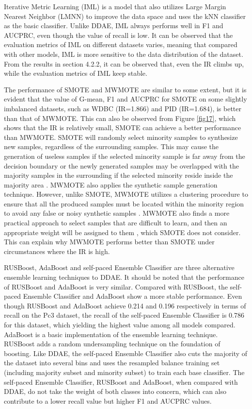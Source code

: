 Iterative Metric Learning (IML) is a model that also utilizes Large Margin Nearest Neighbor (LMNN) to improve the data space and uses the kNN classifier as the basic classifier. Unlike DDAE, IML always performs well in F1 and AUCPRC, even though the value of recall is low. It can be observed that the evaluation metrics of IML on different datasets varies, meaning that compared with other models, IML is more sensitive to the data distribution of the dataset. From the results in section 4.2.2, it can be observed that, even the IR climbs up, while the evaluation metrics of IML keep stable.

The performance of SMOTE and MWMOTE are similar to some extent, but it is evident that the value of G-mean, F1 and AUCPRC for SMOTE on some slightly imbalanced datasets, such as WDBC (IR=1.866) and PID (IR=1.684), is better than that of MWMOTE. This can also be observed from Figure \ref{fig17}, which shows that the IR is relatively small, SMOTE can achieve a better performance than MWMOTE. SMOTE will randomly select minority samples to synthesize new samples, regardless of the surrounding samples. This may cause the generation of useless samples if the selected minority sample is far away from the decision boundary or the newly generated samples may be overlapped with the majority samples in the surrounding if the selected minority reside inside the majority area \cite{61}. MWMOTE also applies the synthetic sample generation technique. However, unlike SMOTE, MWMOTE utilizes a clustering procedure to ensure that all the produced samples must be located within the minority region to avoid any false or noisy synthetic samples \cite{62}. MWMOTE also finds a more practical approach to select samples that are difficult to learn, and then an appropriate weight will be assigned to them \cite{62}, which SMOTE does not consider. This can explain why MWMOTE performs better than SMOTE under circumstances where the IR is high. 

RUSBoost, AdaBoost and self-paced Ensemble Classifier are three alternative ensemble learning techniques to DDAE. It should be noted that the performance of RUSBoost and AdaBoost is very similar. Compared with RUSBoost, the self-paced Ensemble Classifier and AdaBoost show a more stable performance. Even though RUSBoost and AdaBoost achieve 0.214 and 0.196  respectively in terms of recall on the Pc3 dataset, the recall of the self-paced Ensemble Classifier is 0.786 for this dataset, which yielding the highest value among all models compared. AdaBoost is a basic implementation of the ensemble learning technique. RUSBoost adds a random undersampling technique on the foundation of boosting. Like DDAE, the self-paced Ensemble Classifier also cuts the majority of the dataset into several bins and uses the resampled balance training set (including majority subset and minority subset) to train each base classifier. The self-paced Ensemble Classifier, RUSBoost and AdaBoost, when compared with DDAE, do not take the weight of both classes into concern, which can also contribute to a lower recall value but higher F1 and AUCPRC values. 

